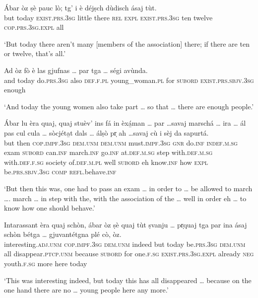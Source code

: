 \begin{linenumbers}
	\gll    Ábar òz ṣè pauc lò; tg’ i è déjṣch dùdisch ásaj tùt.\\
	but today \textsc{exist.prs.3sg} little there \textsc{rel} \textsc{expl} \textsc{exist.prs.3sg} ten twelve \textsc{cop.prs.3sg.expl} all\\
\end{linenumbers}
\medskip
\glt `But today there aren’t many [members of the association] there; if there are ten or twelve, that’s all.'
\medskip

\begin{linenumbers}
	\gll    Ad òz fò è las gjufnas … par tga … ségi avùnda.\\
	and today do.\textsc{prs.3sg} also  \textsc{def.f.pl} young\_woman.\textsc{pl} {} for \textsc{subord} {} \textsc{exist.prs.sbjv.3sg} enough\\
\end{linenumbers}
\medskip
\glt `And today the young women also take part … so that … there are enough people.'
\medskip

\begin{linenumbers}
	\gll    Ábar lu èra quaj, quaj stuèv’ ins fá in èxá̱man … par …savaj marschá … ira … ál pas cul cula … sòcjéta̱t dals … álṣò pr̩ ah …savaj cù i sèj da sapurtá.\\
	but then \textsc{cop.impf.3sg} \textsc{dem.unm} \textsc{dem.unm} must.\textsc{impf.3sg} \textsc{gnr} do.\textsc{inf} \textsc{indef.m.sg} exam {} \textsc{subord} {} can.\textsc{inf} march.\textsc{inf} {} go.\textsc{inf} {} at.\textsc{def.m.sg} step with.\textsc{def.m.sg} with.\textsc{def.f.sg} {} society  of.\textsc{def.m.pl} {} well \textsc{subord} eh {} know.\textsc{inf} how \textsc{expl} be.\textsc{prs.sbjv.3sg} \textsc{comp} \textsc{refl.}behave.\textsc{inf}\\
\end{linenumbers}
\medskip
\glt `But then this was, one had to pass an exam … in order to … be allowed to march …. march … in step with the, with the association of the … well in order eh … to know how one should behave.'
\medskip

\begin{linenumbers}
	\gll    Intarassant èra quaj schòn, ábar òz ṣè quaj tùt ṣvanju … pr̩quaj tga par ina ásaj schòn bétga … gjuvantétgna plé cò, òz.\\
	interesting.\textsc{adj.unm} \textsc{cop.impf.3sg} \textsc{dem.unm} indeed but today be.\textsc{prs.3sg} \textsc{dem.unm} all disappear.\textsc{ptcp.unm} {} because \textsc{subord} for one.\textsc{f.sg} \textsc{exist.prs.3sg.expl} already \textsc{neg} {} youth.\textsc{f.sg} more here today \\
\end{linenumbers}
\medskip
\glt `This was interesting indeed, but today this has all disappeared … because on the one hand there are no … young people here any more.'
\medskip


